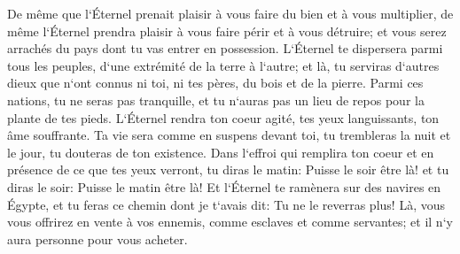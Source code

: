 \verse De même que l`Éternel prenait plaisir à vous faire du bien et à vous multiplier, de même l`Éternel prendra plaisir à vous faire périr et à vous détruire; et vous serez arrachés du pays dont tu vas entrer en possession. 
\verse L`Éternel te dispersera parmi tous les peuples, d`une extrémité de la terre à l`autre; et là, tu serviras d`autres dieux que n`ont connus ni toi, ni tes pères, du bois et de la pierre. 
\verse Parmi ces nations, tu ne seras pas tranquille, et tu n`auras pas un lieu de repos pour la plante de tes pieds. L`Éternel rendra ton coeur agité, tes yeux languissants, ton âme souffrante. 
\verse Ta vie sera comme en suspens devant toi, tu trembleras la nuit et le jour, tu douteras de ton existence. 
\verse Dans l`effroi qui remplira ton coeur et en présence de ce que tes yeux verront, tu diras le matin: Puisse le soir être là! et tu diras le soir: Puisse le matin être là! 
\verse Et l`Éternel te ramènera sur des navires en Égypte, et tu feras ce chemin dont je t`avais dit: Tu ne le reverras plus! Là, vous vous offrirez en vente à vos ennemis, comme esclaves et comme servantes; et il n`y aura personne pour vous acheter. 

